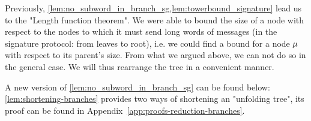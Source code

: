 Previously, \cref{lem:no_subword_in_branch_sg,lem:towerbound_signature} lead us to the "Length function theorem". We were able to bound the size of a node with respect to the nodes to which it must send long words of messages (in the signature protocol: from leaves to root), i.e. we could find a bound for a node $\mu$ with respect to its parent's size. From what we argued above, we can not do so in the general case.
We will thus rearrange the tree in a convenient manner. 

A new version of \cref{lem:no_subword_in_branch_sg} can be found below: \cref{lem:shortening-branches} provides two ways of shortening an "unfolding tree", its proof can be found in Appendix~\ref{app:proofs-reduction-branches}. 











%
%

